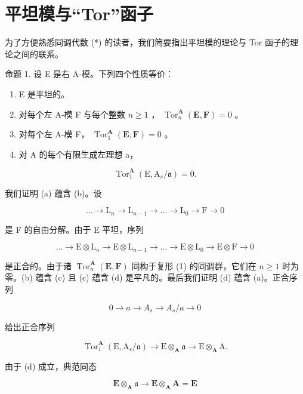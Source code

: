 \section{平坦模与``Tor''函子}

为了方便熟悉同调代数 (*) 的读者，我们简要指出平坦模的理论与 Tor 函子的理论之间的联系。

命题 1. 设 E 是右 A-模。下列四个性质等价：

\begin{enumerate}
\def\labelenumi{(\alph{enumi})}
\item
  E 是平坦的。
\item
  对每个左 A-模 F 与每个整数 \(n \geqslant 1\) ， \(\operatorname{Tor}_n^{\mathbf{A}}(\mathbf{E}, \mathbf{F}) = 0\) 。
\item
  对每个左 A-模 F， \(\operatorname{Tor}_{1}^{\mathbf{A}}(\mathbf{E},\mathbf{F}) = 0\) 。
\item
  对 A 的每个有限生成左理想 a，
\end{enumerate}

\[
\operatorname{Tor} _ {1} ^ {\mathbf {A}} (\mathrm{E}, \mathrm{A} _ {s} / \mathfrak {a}) = 0.
\]

我们证明 (a) 蕴含 (b)。设

\[
\dots \rightarrow \mathrm{L} _ {n} \rightarrow \mathrm{L} _ {n - 1} \rightarrow \dots \rightarrow \mathrm{L} _ {0} \rightarrow \mathrm{F} \rightarrow 0
\]

是 F 的自由分解。由于 E 平坦，序列

\[
\dots \rightarrow \mathrm{E} \otimes \mathrm{L} _ {n} \rightarrow \mathrm{E} \otimes \mathrm{L} _ {n - 1} \rightarrow \dots \rightarrow \mathrm{E} \otimes \mathrm{L} _ {0} \rightarrow \mathrm{E} \otimes \mathrm{F} \rightarrow 0\tag{1}
\]

是正合的。由于诸 \(\operatorname{Tor}_n^{\mathbf{A}}(\mathbf{E},\mathbf{F})\) 同构于复形 (1) 的同调群，它们在 \(n\geqslant 1\) 时为零。(b) 蕴含 (c) 且 (c) 蕴含 (d) 是平凡的。最后我们证明 (d) 蕴含 (a)。正合序列

\[
0 \rightarrow a \rightarrow A _ {s} \rightarrow A _ {s} / a \rightarrow 0
\]

给出正合序列

\[
\operatorname{Tor} _ {1} ^ {\mathbf {A}} (\mathrm{E}, \mathrm{A} _ {s} / \mathfrak {a}) \rightarrow \mathrm{E} \otimes_ {\mathbf {A}} \mathfrak {a} \rightarrow \mathrm{E} \otimes_ {\mathbf {A}} \mathrm{A}.
\]

由于 (d) 成立，典范同态

\[
\mathbf {E} \otimes_ {\mathbf {A}} \mathfrak {a} \rightarrow \mathbf {E} \otimes_ {\mathbf {A}} \mathbf {A} = \mathbf {E}
\]

